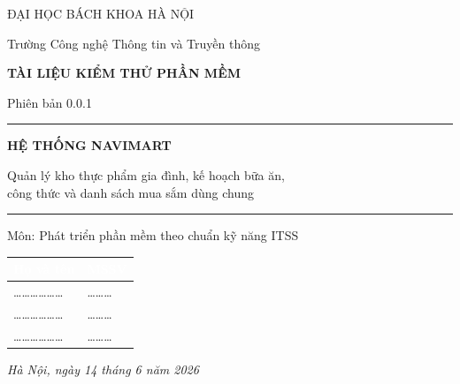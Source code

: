 \documentclass[12pt,a4paper]{article}
\newcommand{\thead}[1]{\textbf{\textcolor{white}{#1}}}
\begin{document}
\begin{titlepage}
\centering
\vspace*{1.2cm}
{\large ĐẠI HỌC BÁCH KHOA HÀ NỘI\par}
{\large Trường Công nghệ Thông tin và Truyền thông\par}
\vspace{2.4cm}
{\large\bfseries TÀI LIỆU KIỂM THỬ PHẦN MỀM\par}
{\normalsize Phiên bản 0.0.1\par}
\vspace{1.4cm}
\rule{0.8\linewidth}{0.4pt}\par
\vspace{0.6cm}
{\Huge\bfseries\color{navy} HỆ THỐNG NAVIMART\par}
\vspace{0.5cm}
{\large Quản lý kho thực phẩm gia đình, kế hoạch bữa ăn,\\[2pt] công thức và danh sách mua sắm dùng chung\par}
\vspace{0.4cm}
\rule{0.8\linewidth}{0.4pt}\par
\vspace{1.2cm}
{\large Môn: Phát triển phần mềm theo chuẩn kỹ năng ITSS\par}
\vspace{2cm}

\begin{tabular}{|l|l|}
\hline
\rowcolor{headerblue}
\thead{Họ và tên} & \thead{MSSV} \\
\hline
\rule{0pt}{2.4ex}\dots\dots\dots\dots\dots\dots & \dots\dots\dots \\
\hline
\rule{0pt}{2.4ex}\dots\dots\dots\dots\dots\dots & \dots\dots\dots \\
\hline
\rule{0pt}{2.4ex}\dots\dots\dots\dots\dots\dots & \dots\dots\dots \\
\hline
\end{tabular}

\vfill
{\itshape Hà Nội, ngày 14 tháng 6 năm 2026\par}
\end{titlepage}

\tableofcontents
\newpage

\end{document}
